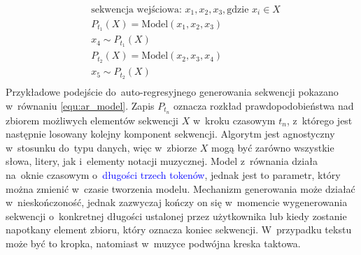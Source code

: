 \documentclass[data-science]{agh-wi} %
\begin{document}
\begin{equation}
    \begin{aligned}
         & \text{sekwencja wejściowa: } x_1, x_2, x_3, \text{gdzie } x_i \in X \\
         & P_{t_1}(X) = \text{Model}(x_1, x_2, x_3)                            \\
         & x_4 \sim P_{t_1}(X)                                                 \\
         & P_{t_2}(X) = \text{Model}(x_2, x_3, x_4)                            \\
         & x_5 \sim P_{t_2}(X)                                                 \\
    \end{aligned}
    \label{equ:ar_model}
\end{equation}
Przykładowe podejście do~auto-regresyjnego generowania sekwencji pokazano w~równaniu \ref*{equ:ar_model}. Zapis $P_{t_n}$ oznacza rozkład prawdopodobieństwa nad zbiorem możliwych elementów sekwencji $X$ w~kroku czasowym $t_n$, z~którego jest następnie losowany kolejny komponent sekwencji. Algorytm jest agnostyczny w~stosunku do~typu danych, więc w~zbiorze $X$ mogą być zarówno wszystkie słowa, litery, jak i~elementy notacji muzycznej. Model z~równania działa na~oknie czasowym o~\textcolor{blue}{długości trzech tokenów}, jednak jest to parametr, który można zmienić w~czasie tworzenia modelu. Mechanizm generowania może działać w~nieskończoność, jednak zazwyczaj kończy on się w~momencie wygenerowania sekwencji o~konkretnej długości ustalonej przez użytkownika lub kiedy zostanie napotkany element zbioru, który oznacza koniec sekwencji. W~przypadku tekstu może być to kropka, natomiast w~muzyce podwójna kreska taktowa.
\end{document}
